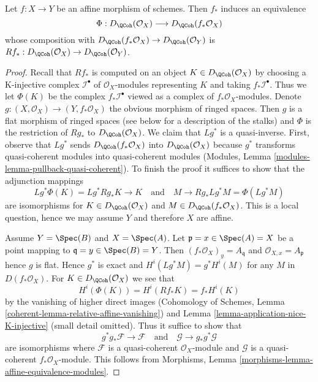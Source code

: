 \begin{lemma}
\label{lemma-affine-morphism-equivalence}
Let $f : X \to Y$ be an affine morphism of schemes. Then $f_*$ induces
an equivalence
$$
\Phi : D_\QCoh(\mathcal{O}_X) \longrightarrow D_\QCoh(f_*\mathcal{O}_X)
$$
whose composition with $D_\QCoh(f_*\mathcal{O}_X) \to D_\QCoh(\mathcal{O}_Y)$
is $Rf_* : D_\QCoh(\mathcal{O}_X) \to D_\QCoh(\mathcal{O}_Y)$.
\end{lemma}

\begin{proof}
Recall that $Rf_*$ is computed on an object $K \in D_\QCoh(\mathcal{O}_X)$
by choosing a K-injective complex $\mathcal{I}^\bullet$ of
$\mathcal{O}_X$-modules representing $K$ and taking $f_*\mathcal{I}^\bullet$.
Thus we let $\Phi(K)$ be the complex $f_*\mathcal{I}^\bullet$
viewed as a complex of $f_*\mathcal{O}_X$-modules.
Denote $g : (X, \mathcal{O}_X) \to (Y, f_*\mathcal{O}_X)$ the
obvious morphism of ringed spaces. Then $g$ is a flat morphism of
ringed spaces (see below for a description of the stalks) and
$\Phi$ is the restriction of $Rg_*$ to $D_\QCoh(\mathcal{O}_X)$.
We claim that $Lg^*$ is a quasi-inverse. First, observe that
$Lg^*$ sends $D_\QCoh(f_*\mathcal{O}_X)$ into $D_\QCoh(\mathcal{O}_X)$
because $g^*$ transforms quasi-coherent modules into quasi-coherent
modules (Modules, Lemma \ref{modules-lemma-pullback-quasi-coherent}).
To finish the proof it suffices to show that
the adjunction mappings
$$
Lg^*\Phi(K) = Lg^*Rg_*K \to K
\quad\text{and}\quad
M \to Rg_*Lg^*M = \Phi(Lg^*M)
$$
are isomorphisms for $K \in D_\QCoh(\mathcal{O}_X)$ and
$M \in D_\QCoh(f_*\mathcal{O}_X)$. This is a local question, hence
we may assume $Y$ and therefore $X$ are affine.

\medskip\noindent
Assume $Y = \Spec(B)$ and $X = \Spec(A)$. Let
$\mathfrak p = x \in \Spec(A) = X$ be a point mapping to
$\mathfrak q = y \in \Spec(B) = Y$. Then
$(f_*\mathcal{O}_X)_y = A_\mathfrak q$ and $\mathcal{O}_{X, x} = A_\mathfrak p$
hence $g$ is flat. Hence $g^*$ is exact and $H^i(Lg^*M) = g^*H^i(M)$
for any $M$ in $D(f_*\mathcal{O}_X)$.
For $K \in D_\QCoh(\mathcal{O}_X)$ we see that
$$
H^i(\Phi(K)) = H^i(Rf_*K) = f_*H^i(K)
$$
by the vanishing of higher direct images
(Cohomology of Schemes, Lemma \ref{coherent-lemma-relative-affine-vanishing})
and Lemma \ref{lemma-application-nice-K-injective} (small detail omitted).
Thus it suffice to show that
$$
g^*g_*\mathcal{F} \to \mathcal{F}
\quad\text{and}\quad
\mathcal{G} \to g_*g^*\mathcal{G}
$$
are isomorphisms where $\mathcal{F}$ is
a quasi-coherent $\mathcal{O}_X$-module and $\mathcal{G}$ is
a quasi-coherent $f_*\mathcal{O}_X$-module. This follows from
Morphisms, Lemma \ref{morphisms-lemma-affine-equivalence-modules}.
\end{proof}





